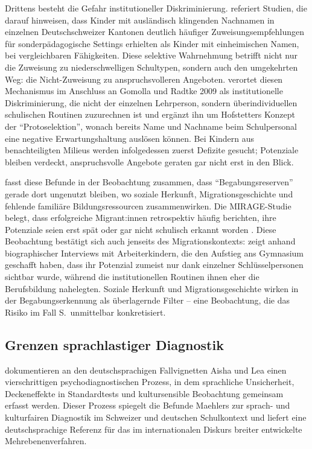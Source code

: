 \documentclass[ngerman, a4paper]{article}
\begin{document}
Drittens besteht die Gefahr institutioneller Diskriminierung.
\textcite[S.\,63--77]{kappus2010migration} referiert Studien, die darauf
hinweisen, dass Kinder mit ausländisch klingenden Nachnamen in einzelnen
Deutschschweizer Kantonen deutlich häufiger Zuweisungsempfehlungen für
sonderpädagogische Settings erhielten als Kinder mit einheimischen Namen,
bei vergleichbaren Fähigkeiten. Diese selektive Wahrnehmung betrifft
nicht nur die Zuweisung zu niederschwelligen Schultypen, sondern auch den
umgekehrten Weg: die Nicht-Zuweisung zu anspruchsvolleren Angeboten.
\textcite[S.\,58--59]{stamm2025vonuntennachoben} verortet diesen
Mechanismus im Anschluss an Gomolla und Radtke 2009 als institutionelle
Diskriminierung, die nicht der einzelnen Lehrperson, sondern
überindividuellen schulischen Routinen zuzurechnen ist und ergänzt ihn
um Hofstetters Konzept der \enquote{Protoselektion}, wonach bereits Name
und Nachname beim Schulpersonal eine negative Erwartungshaltung auslösen
können. Bei Kindern aus benachteiligten Milieus werden infolgedessen
zuerst Defizite gesucht; Potenziale bleiben verdeckt, anspruchsvolle
Angebote geraten gar nicht erst in den Blick.

\textcite[S.\,576--585]{stamm2021fehlenderblick} fasst diese 
Befunde in der Beobachtung zusammen, dass \enquote{Begabungsreserven}
gerade dort ungenutzt bleiben, wo soziale Herkunft, Migrationsgeschichte und fehlende
familiäre Bildungsressourcen zusammenwirken. Die MIRAGE-Studie belegt, dass
erfolgreiche Migrant:innen retrospektiv häufig berichten, ihre Potenziale seien erst spät
oder gar nicht schulisch erkannt worden \parencite[S.\,102--115]{stamm2014mirage}. Diese
Beobachtung bestätigt sich auch jenseits des Migrationskontexts:
\textcite{stamm2025vonuntennachoben} zeigt anhand biographischer Interviews
mit Arbeiterkindern, die den Aufstieg ans Gymnasium geschafft haben, dass
ihr Potenzial zumeist nur dank einzelner Schlüsselpersonen sichtbar wurde,
während die institutionellen Routinen ihnen eher die Berufsbildung
nahelegten. Soziale Herkunft und Migrationsgeschichte wirken in der
Begabungserkennung als überlagernde Filter -- eine Beobachtung, die das
Risiko im Fall S.\ unmittelbar konkretisiert.

\subsection{Grenzen sprachlastiger Diagnostik}

\textcite[S.\,239--251]{gauckreimann2021psychdiagnostik} dokumentieren an den
deutschsprachigen Fallvignetten Aisha und Lea einen vierschrittigen
psychodiagnostischen Prozess, in dem sprachliche Unsicherheit,
Deckeneffekte in Standardtests und kultursensible Beobachtung gemeinsam
erfasst werden. Dieser Prozess spiegelt die Befunde Maehlers zur sprach-
und kulturfairen Diagnostik im Schweizer und deutschen Schulkontext und
liefert eine deutschsprachige Referenz für das im internationalen Diskurs
breiter entwickelte Mehrebenenverfahren.
\end{document}
